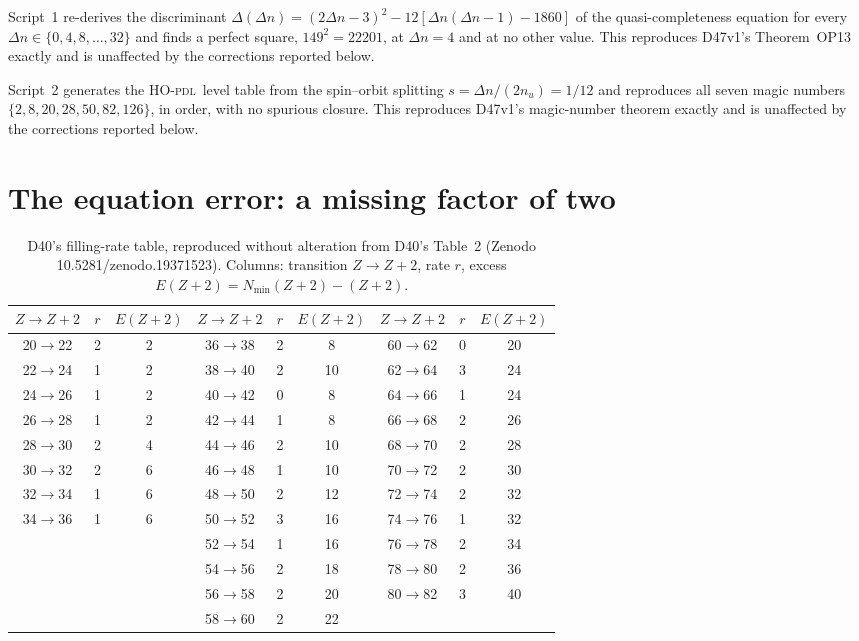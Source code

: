 \documentclass[12pt,a4paper]{article}
\theoremstyle{plain}
\theoremstyle{definition}
\theoremstyle{remark}
\newenvironment{resolvedproblem}[1][]{%
\begin{tcolorbox}[resolvedstyle,title={Vindicated\ifx\relax#1\relax\else: #1\fi}]}{\end{tcolorbox}}
\newcommand{\PDL}{\textsc{pdl}}
\newcommand{\nuu}{n_u}
\newcommand{\Dn}{\Delta n}
\newcommand{\Nmin}{N_{\min}}
\begin{document}
\begin{resolvedproblem}[OP13, unaffected]
Script~1 re-derives the discriminant $\Delta(\Dn)=(2\Dn-3)^2-12[\Dn(\Dn-1)-1860]$ of the quasi-completeness equation for every $\Dn\in\{0,4,8,\ldots,32\}$ and finds a perfect square, $149^2=22201$, at $\Dn=4$ and at no other value. This reproduces D47v1's Theorem~OP13 exactly and is unaffected by the corrections reported below.
\end{resolvedproblem}

\begin{resolvedproblem}[Magic numbers, unaffected]
Script~2 generates the HO-\PDL\ level table from the spin--orbit splitting $s=\Dn/(2\nuu)=1/12$ and reproduces all seven magic numbers $\{2,8,20,28,50,82,126\}$, in order, with no spurious closure. This reproduces D47v1's magic-number theorem exactly and is unaffected by the corrections reported below.
\end{resolvedproblem}

\section{The equation error: a missing factor of two}
\label{sec:factor2}

\begin{table}[H]
\centering
\caption{D40's filling-rate table, reproduced without alteration from D40's Table~2 (Zenodo 10.5281/zenodo.19371523). Columns: transition $Z\to Z+2$, rate $r$, excess $E(Z+2)=\Nmin(Z+2)-(Z+2)$.}
\label{tab:d40-table}
\small
\begin{tabular}{ccc|ccc|ccc}
\toprule
$Z\to Z{+}2$ & $r$ & $E(Z{+}2)$ & $Z\to Z{+}2$ & $r$ & $E(Z{+}2)$ & $Z\to Z{+}2$ & $r$ & $E(Z{+}2)$ \\
\midrule
20$\to$22 & 2 & 2  & 36$\to$38 & 2 & 8  & 60$\to$62 & 0 & 20 \\
22$\to$24 & 1 & 2  & 38$\to$40 & 2 & 10 & 62$\to$64 & 3 & 24 \\
24$\to$26 & 1 & 2  & 40$\to$42 & 0 & 8  & 64$\to$66 & 1 & 24 \\
26$\to$28 & 1 & 2  & 42$\to$44 & 1 & 8  & 66$\to$68 & 2 & 26 \\
28$\to$30 & 2 & 4  & 44$\to$46 & 2 & 10 & 68$\to$70 & 2 & 28 \\
30$\to$32 & 2 & 6  & 46$\to$48 & 1 & 10 & 70$\to$72 & 2 & 30 \\
32$\to$34 & 1 & 6  & 48$\to$50 & 2 & 12 & 72$\to$74 & 2 & 32 \\
34$\to$36 & 1 & 6  & 50$\to$52 & 3 & 16 & 74$\to$76 & 1 & 32 \\
          &   &    & 52$\to$54 & 1 & 16 & 76$\to$78 & 2 & 34 \\
          &   &    & 54$\to$56 & 2 & 18 & 78$\to$80 & 2 & 36 \\
          &   &    & 56$\to$58 & 2 & 20 & 80$\to$82 & 3 & 40 \\
          &   &    & 58$\to$60 & 2 & 22 &           &   &    \\
\bottomrule
\end{tabular}
\end{table}
\end{document}
